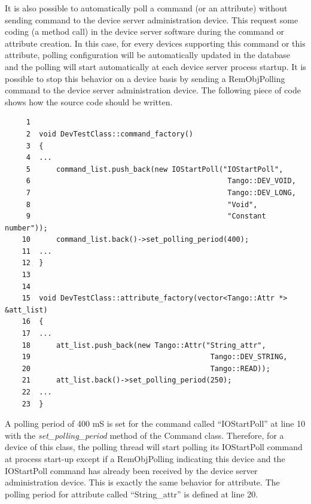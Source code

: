 It is also possible to automatically poll a command (or an attribute)
without sending command to the device server administration device.
This request some coding (a method call) in the device server software
during the command or attribute creation. In this case, for every
devices supporting this command or this attribute, polling configuration
will be automatically updated in the database and the polling will
start automatically at each device server process startup. It is possible
to stop this behavior on a device basis by sending a RemObjPolling
command to the device server administration device. The following
piece of code shows how the source code should be written.


\begin{verbatim}
     1  
     2  void DevTestClass::command_factory()
     3  {
     4  ...
     5      command_list.push_back(new IOStartPoll("IOStartPoll",
     6                                              Tango::DEV_VOID,
     7                                              Tango::DEV_LONG,
     8                                              "Void",
     9                                              "Constant number"));
    10      command_list.back()->set_polling_period(400);
    11  ...
    12  }
    13  
    14  
    15  void DevTestClass::attribute_factory(vector<Tango::Attr *> &att_list)
    16  {
    17  ...
    18      att_list.push_back(new Tango::Attr("String_attr",
    19                                          Tango::DEV_STRING,
    20                                          Tango::READ));
    21      att_list.back()->set_polling_period(250);
    22  ...
    23  }
\end{verbatim}


A polling period of 400 mS is set for the command called ``IOStartPoll''
at line 10 with the \emph{set\_polling\_period} method of the Command
class. Therefore, for a device of this class, the polling thread will
start polling its IOStartPoll command at process start-up except if
a RemObjPolling indicating this device and the IOStartPoll command
has already been received by the device server administration device.
This is exactly the same behavior for attribute. The polling period
for attribute called ``String\_attr'' is defined at line 20.


